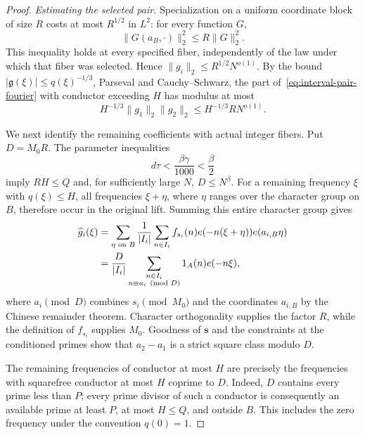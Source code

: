 \begin{proof}
\textit{Estimating the selected pair.}\quad
Specialization on a uniform coordinate block of size \(R\) costs at
most \(R^{1/2}\) in \(L^2\): for every function \(G\),
\[
 \|G(a_B,\cdot)\|_2^2\le R\|G\|_2^2.
\]
This inequality holds at every specified fiber, independently of the
law under which that fiber was selected. Hence
\(\|g_i\|_2\le R^{1/2}N^{o(1)}\). By the bound
\(|\mathfrak g(\xi)|\le q(\xi)^{-1/3}\), Parseval and
Cauchy--Schwarz, the part of~\eqref{eq:interval-pair-fourier} with
conductor exceeding \(H\) has modulus at most
\begin{equation}
 H^{-1/3}\|g_1\|_2\|g_2\|_2
 \le H^{-1/3}R N^{o(1)}.
 \label{eq:interval-pair-tail}
\end{equation}

We next identify the remaining coefficients with actual integer fibers.
Put \(D=M_0R\). The parameter inequalities
\begin{equation}
 d\tau<\frac{\beta\gamma}{1000}<\frac\beta2
 \label{eq:interval-parameter-room}
\end{equation}
imply \(RH\le Q\) and, for sufficiently large \(N\), \(D\le N^\beta\).
For a remaining frequency \(\xi\) with \(q(\xi)\le H\), all frequencies
\(\xi+\eta\), where \(\eta\) ranges over the character group on \(B\),
therefore occur in the original lift. Summing this entire character group
gives
\begin{align}
 \widehat g_i(\xi)
 &=\sum_{\eta\text{ on }B}\frac1{|I_i|}
     \sum_{n\in I_i}f_{s_i}(n)e(-n(\xi+\eta))e(a_{i,B}\eta)\notag\\
 &=\frac{D}{|I_i|}
     \sum_{\substack{n\in I_i\\n\equiv a_i\pmod D}}
           1_A(n)e(-n\xi),
 \label{eq:interval-selected-fiber}
\end{align}
where \(a_i\pmod D\) combines \(s_i\pmod {M_0}\) and the coordinates
\(a_{i,B}\) by the Chinese remainder theorem. Character orthogonality
supplies the factor \(R\), while the definition of \(f_{s_i}\) supplies
\(M_0\). Goodness of \(\boldsymbol s\) and the constraints at the
conditioned primes show that \(a_2-a_1\) is a strict square class
modulo \(D\).

The remaining frequencies of conductor at most \(H\) are precisely the
frequencies with squarefree conductor at most \(H\) coprime to \(D\).
Indeed, \(D\) contains every prime less than \(P\); every prime divisor
of such a conductor is consequently an available prime at least \(P\),
at most \(H\le Q\), and outside \(B\). This includes the zero
frequency under the convention \(q(0)=1\).


\end{proof}
